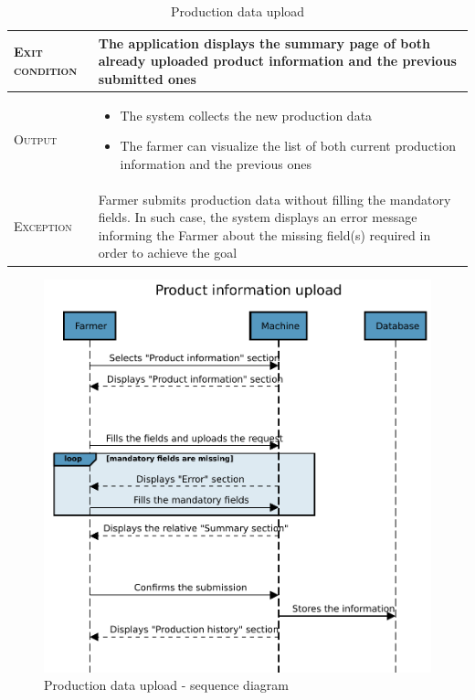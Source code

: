\begin{table}[H]
\begin{tabular}[c]{|l|p{}|}
        \hline %
        \textsc{Exit condition}    &  The application displays the summary page of both already uploaded product information and the previous submitted ones\\
    	\hline %
    	\textsc{Output}             &  \begin{itemize}
    	    \item The system collects the new production data
    	    \item The farmer can visualize the list of both current production information and the previous ones
    	\end{itemize}\\
    	\hline %
    	\textsc{Exception}         &  Farmer submits production data without filling the mandatory fields. In such case, the system displays an error message informing the Farmer about the missing field(s) required in order to achieve the goal\\
    	\hline %
        
    \end{tabular}
    \caption{\label{tab:Production_data_submission}Production data upload}
\end{table}


\begin{figure}[H]
	\centering
    \includegraphics[page=1, width=\textwidth]{Images/SeqDiag/product_info_upload_seq_diag.pdf}
	\caption{\label{fig:product_info_seq_diag}Production data upload - sequence diagram}
\end{figure}


